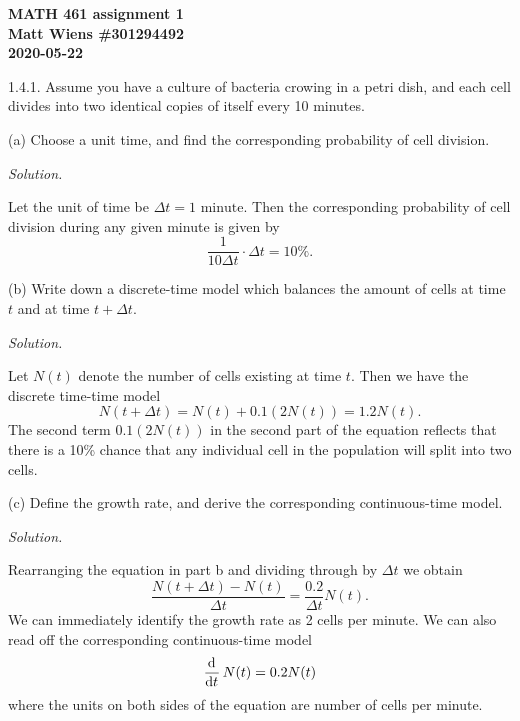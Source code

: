 \documentclass{article}
\begin{document}
\textbf{MATH 461 assignment 1} \\
\textbf{Matt Wiens \#301294492} \\
\textbf{2020-05-22}

1.4.1. Assume you have a culture of bacteria crowing in a petri dish,
and each cell divides into two identical copies of itself every 10
minutes.

(a) Choose a unit time, and find the corresponding probability of cell division.

\textit{Solution.}

Let the unit of time be $\Delta t = 1 \text{ minute}$. Then the
corresponding probability of cell division during any given minute is
given by
%
\begin{equation*}
    \frac{1}{10 \Delta t} \cdot \Delta t = 10\%
    .
\end{equation*}

\newpage

(b) Write down a discrete-time model which balances the amount of cells
at time $t$ and at time $t + \Delta t$.

\textit{Solution.}

Let $N(t)$ denote the number of cells existing at time $t$. Then we have
the discrete time-time model
%
\begin{equation*}
    N(t + \Delta t) = N(t) + 0.1 (2 N(t)) = 1.2 N(t)
    .
\end{equation*}
%
The second term $0.1 (2 N(t))$ in the second part of the equation
reflects that there is a 10\% chance that any individual cell in the
population will split into two cells.

\newpage

(c) Define the growth rate, and derive the corresponding continuous-time model.

\textit{Solution.}

Rearranging the equation in part b and dividing through by $\Delta t$ we obtain
%
\begin{equation*}
    \frac{N(t + \Delta t) - N(t)}{\Delta t} = \frac{0.2}{\Delta t} N(t)
    .
\end{equation*}
%
We can immediately identify the growth rate as 2 cells per minute. We can
also read off the corresponding continuous-time model
%
\begin{equation*}
    \dod{}{t} N(t) = 0.2 N(t)
\end{equation*}
%
where the units on both sides of the equation are number of cells per minute.

\newpage
\end{document}
